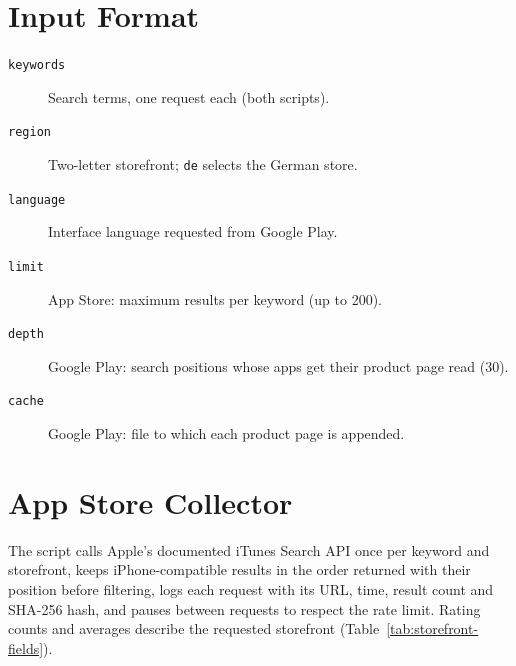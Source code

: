 \documentclass[twoside,its]{bossthesis}
\begin{document}
\section{Input Format}
\begin{description}
  \item[\texttt{keywords}] Search terms, one request each (both scripts).
  \item[\texttt{region}] Two-letter storefront; \texttt{de} selects the German store.
  \item[\texttt{language}] Interface language requested from Google Play.
  \item[\texttt{limit}] App Store: maximum results per keyword (up to 200).
  \item[\texttt{depth}] Google Play: search positions whose apps get their
    product page read (30).
  \item[\texttt{cache}] Google Play: file to which each product page is appended.
\end{description}

\par\medskip\noindent
\begin{minipage}{\linewidth}

\end{minipage}
\par\medskip

\noindent
\begin{minipage}{\linewidth}

\end{minipage}
\par\medskip

\section{App Store Collector}
The script calls Apple's documented iTunes Search API once per keyword and
storefront, keeps iPhone-compatible results in the order returned with their
position before filtering, logs each request with its URL, time, result count and
SHA-256 hash, and pauses between requests to respect the rate limit. Rating counts
and averages describe the requested storefront (Table~\ref{tab:storefront-fields}).
\end{document}
